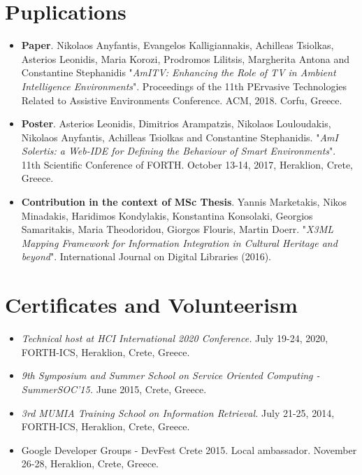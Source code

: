 \documentclass[11pt]{article}
\begin{document}
\section{Puplications}
\begin{itemize}
\item
\textbf{Paper}. Nikolaos Anyfantis, Evangelos Kalligiannakis, Achilleas Tsiolkas, Asterios Leonidis, Maria Korozi, Prodromos Lilitsis, Margherita Antona and Constantine Stephanidis "\textit{AmITV: Enhancing the Role of TV in Ambient Intelligence Environments}". Proceedings of the 11th PErvasive Technologies Related to Assistive Environments Conference. ACM, 2018. Corfu, Greece.

\item
\textbf{Poster}. Asterios Leonidis, Dimitrios Arampatzis, Nikolaos Louloudakis, Nikolaos Anyfantis, Achilleas Tsiolkas and Constantine Stephanidis. "\textit{AmI Solertis: a Web-IDE for Defining the Behaviour of Smart Environments}". 11th Scientific Conference of FORTH. October 13-14, 2017, Heraklion, Crete, Greece.

\item
\textbf{Contribution in the context of MSc Thesis}. Yannis Marketakis, Nikos Minadakis, Haridimos Kondylakis, Konstantina Konsolaki, Georgios Samaritakis, Maria Theodoridou, Giorgos Flouris, Martin Doerr. "\textit{X3ML Mapping Framework for Information Integration in Cultural Heritage and beyond}". International Journal on Digital Libraries (2016).
\end{itemize}

\section{Certificates and Volunteerism}
\begin{itemize}
\item
\textit{Technical host at HCI International 2020 Conference.} July 19-24, 2020, FORTH-ICS, Heraklion, Crete, Greece.
\item
\textit{9th Symposium and Summer School on Service Oriented Computing - SummerSOC'15.} June 2015, Crete, Greece.
\item
\textit{3rd MUMIA Training School on Information Retrieval.} July 21-25, 2014, FORTH-ICS, Heraklion, Crete, Greece.
\item
Google Developer Groups - DevFest Crete 2015. Local ambassador. November 26-28, Heraklion, Crete, Greece. 
\end{itemize}
\end{document}
